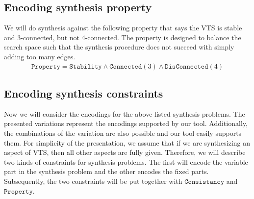 
\subsection{Encoding synthesis property}

We will do synthesis against the following property that says the VTS
is stable and 3-connected, but not 4-connected.
%
The property is designed to balance the search space such that the synthesis procedure does not
succeed with simply adding too many edges. 
%
\begin{align*}
  \texttt{Property} =  \texttt{Stability} \land \texttt{Connected}(3) \land \texttt{DisConnected}(4)
\end{align*}

\subsection{Encoding synthesis constraints}

Now we will consider the encodings for  the above
listed synthesis problems.
%
The presented variations represent the encodings
supported by our tool.
%
Additionally, the combinations of the variation are also possible and
our tool easily supports them.
%
For simplicity of the presentation, we assume that if we are
synthesizing an aspect of VTS, then all other aspects are fully given.
%
Therefore, we will describe two kinds of constraints for synthesis
problems.
%
The first will encode the variable part in the synthesis problem and
the other encodes the fixed parts.
%
Subsequently, the two constraints will be put together with 
$\texttt{Consistancy}$ and 
$\texttt{Property}$.

